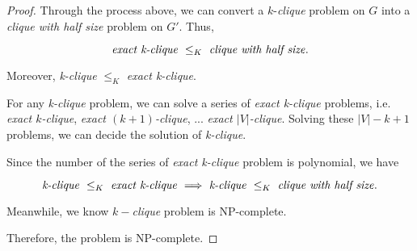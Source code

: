 \documentclass{article}
\begin{document}
\begin{proof}
    \vspace{0.5em} \hspace{1.3em}
    Through the process above, we can convert a $k$-\textit{clique} problem on $G$ into a \textit{clique with half size} problem on $G'$. Thus,
    
    \vspace{-2em}
    $$\text{\textit{exact k-clique}}\ \le_K\ \text{\textit{clique with half size}}.$$
    
    \vspace{-0.75em} \hspace{1.3em}
    Moreover, \textit{k-clique} $\le_K$ \textit{exact k-clique}.
    
    \hspace{1.3em}
    For any \textit{k-clique} problem, we can solve a series of \textit{exact k-clique} problems, i.e. \textit{exact $k$-clique},  \textit{exact $(k+1)$-clique}, ... \textit{exact $|V|$-clique}. Solving these $|V|-k+1$ problems, we can decide the solution of \textit{k-clique}. 
    
    \hspace{1.3em}
    Since the number of the series of \textit{exact k-clique} problem is polynomial, we have
    
    \vspace{-1.75em}
    $$\text{\textit{k-clique}}\ \le_K\ \text{\textit{exact k-clique}}\ \Longrightarrow\ \text{\textit{k-clique}}\ \le_K\ \text{\textit{clique with half size}}.$$
    
    \hspace{1.3em}
    Meanwhile, we know $k-$\textit{clique} problem is NP-complete.
    
    \hspace{1.3em}
    Therefore, the problem is NP-complete.
\end{proof}

\vspace{1em}
\end{document}
